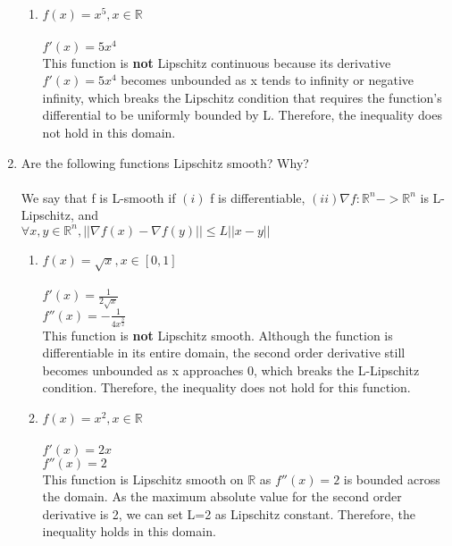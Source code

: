 \documentclass{assignment}
\newcommand{\R}{\mathbb{R}}
\begin{document}
\begin{problem}
\begin{enumerate}
\begin{enumerate}
    \item $f(x) = x^5, x \in \R$\\\\
    $f'(x) = 5x^4$\\

    This function is \textbf{not} Lipschitz continuous because its derivative $f'(x) = 5x^4$ becomes unbounded as x tends to infinity or negative infinity, which breaks the Lipschitz condition that requires the function's differential to be uniformly bounded by L. Therefore, the inequality does not hold in this domain.\\
\end{enumerate}


\item Are the following functions Lipschitz smooth? Why?\\\\
We say that f is L-smooth if $(i)$ f is differentiable, $(ii) \nabla f: \R^n -> \R^n$ is L-Lipschitz, and\\


$\forall x,y \in \R^n, ||\nabla f(x) - \nabla f(y)|| \leq L||x-y||$\\
\begin{enumerate}
    \item $f(x) = \sqrt{x},x \in [0,1]$\\\\
    $f'(x) = \frac{1}{2\sqrt{x}}$\\
    $f''(x) = -\frac{1}{4x^\frac{3}{2}}$\\

    This function is \textbf{not} Lipschitz smooth. Although the function is differentiable in its entire domain, the second order derivative still becomes unbounded as x approaches 0, which breaks the L-Lipschitz condition. Therefore, the inequality does not hold for this function.\\


    \item $f(x) = x^2, x \in \R$\\\\
    $f'(x) = 2x$\\
    $f''(x) = 2$\\
    
    This function is Lipschitz smooth on $\R$ as $f''(x) = 2$ is bounded across the domain. As the maximum absolute value for the second order derivative is 2, we can set L=2 as Lipschitz constant. Therefore, the inequality holds in this domain.\\


\end{enumerate}
\end{enumerate}
\end{problem}
\end{document}
